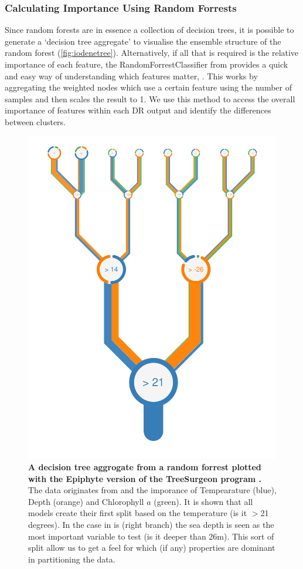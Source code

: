 \subsubsection{Calculating Importance Using Random Forrests}
Since random forests are in essence a collection of decision trees, it is possible to generate a `decision tree aggregate' to visualise the ensemble structure of the random forest \citep{forrester} (\autoref{fig:iodenetree}). Alternatively, if all that is required is the relative importance of each feature, the RandomForrestClassifier from \citep{sklearn} provides a quick and easy way of understanding which features matter,
\citep{handsonml}. This works by aggregating the weighted nodes which use a certain feature using the number of samples and then scales the result to 1. We use this method to access the overall importance of features within each DR output and identify the differences between clusters.


\begin{figure}[H]
     \centering
         \includegraphics[width=.55\textwidth]{4fig/Oi_prj_features_of_RFR(TEMP+DEPTH+ChlrA)_for_depth_5_white.pdf}
        \caption{\textbf{A decision tree aggrogate from a random forrest plotted with the Epiphyte version of the TreeSurgeon program \citep{forrester}.} The data originates from \cite{iodene} and the imporance of Tempearature (blue), Depth (orange) and Chlorophyll $a$ (green). It is shown that all models create their first split based on the temperature (is it $>$21 degrees). In the case in is (right branch) the sea depth is seen as the most important variable to test (is it deeper than 26m). This sort of split allow us to get a feel for which (if any) properties are dominant in partitioning the data. }
        \label{fig:iodenetree}
\end{figure}


